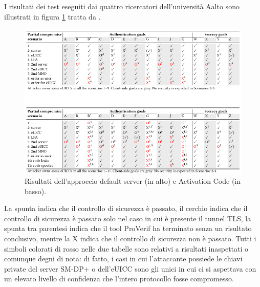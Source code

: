 \documentclass[10pt, oneside]{book}
\begin{document}
\noindent I risultati dei test eseguiti dai quattro ricercatori dell'università Aalto sono illustrati in figura \ref{fig:results2022} tratta da \cite{Sec-analysis}.
\begin{figure}
\includegraphics[width=\linewidth]{results2022.png}
\caption{Risultati dell'approccio default server (in alto) e Activation Code (in basso).}
\label{fig:results2022}
\end{figure}
La spunta indica che il controllo di sicurezza è passato, il cerchio indica che il controllo di sicurezza è passato solo nel caso in cui è presente il tunnel TLS, la spunta tra parentesi indica che il tool ProVerif ha terminato senza un risultato conclusivo, mentre la X indica che il controllo di sicurezza non è passato. Tutti i simboli colorati di rosso nelle due tabelle sono relativi a risultati inaspettati o comunque degni di nota: di fatto, i casi in cui l'attaccante possiede le chiavi private del server SM-DP+ o dell'eUICC sono gli unici in cui ci si aspettava con un elevato livello di confidenza che l'intero protocollo fosse compromesso.
\end{document}
